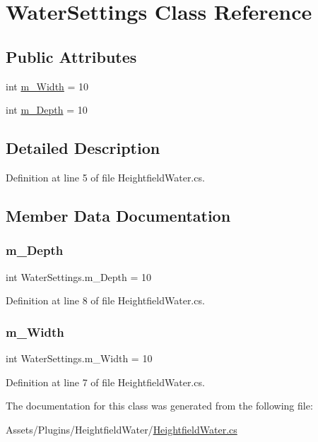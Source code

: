 \hypertarget{class_water_settings}{}\section{Water\+Settings Class Reference}
\label{class_water_settings}
\subsection*{Public Attributes}
\begin{DoxyCompactItemize}
\item 
int \mbox{\hyperlink{class_water_settings_a035913cec83985c0ba57810b39e74357}{m\+\_\+\+Width}} = 10
\item 
int \mbox{\hyperlink{class_water_settings_afb169bbea94de295bda3c76128436ffe}{m\+\_\+\+Depth}} = 10
\end{DoxyCompactItemize}


\subsection{Detailed Description}


Definition at line 5 of file Heightfield\+Water.\+cs.



\subsection{Member Data Documentation}
\mbox{\label{class_water_settings_afb169bbea94de295bda3c76128436ffe}} 
\subsubsection{\texorpdfstring{m\+\_\+\+Depth}{m\_Depth}}
{\footnotesize\ttfamily int Water\+Settings.\+m\+\_\+\+Depth = 10}



Definition at line 8 of file Heightfield\+Water.\+cs.

\mbox{\label{class_water_settings_a035913cec83985c0ba57810b39e74357}} 
\subsubsection{\texorpdfstring{m\+\_\+\+Width}{m\_Width}}
{\footnotesize\ttfamily int Water\+Settings.\+m\+\_\+\+Width = 10}



Definition at line 7 of file Heightfield\+Water.\+cs.



The documentation for this class was generated from the following file\+:\begin{DoxyCompactItemize}
\item 
Assets/\+Plugins/\+Heightfield\+Water/\mbox{\hyperlink{_heightfield_water_8cs}{Heightfield\+Water.\+cs}}\end{DoxyCompactItemize}
